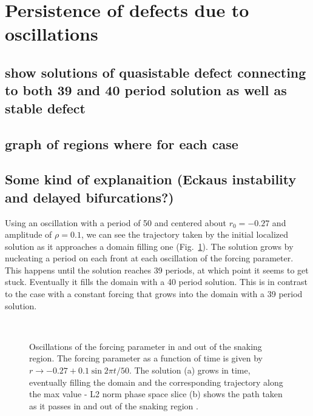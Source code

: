 \documentclass[../main/TimeForcingSHE.tex]{subfiles}
\begin{document}
\section{Persistence of defects due to oscillations}
\subsection{show solutions of quasistable defect connecting to both 39 and 40 period solution as well as stable defect}
\subsection{graph of regions where for each case}
\subsection{Some kind of explanaition (Eckaus instability and delayed bifurcations?)}

Using an oscillation with a period of 50 and centered about $r_0=-0.27$ and amplitude of $\rho =0.1$, we can see the trajectory taken by the initial localized solution as it approaches a domain filling one (Fig.~\ref{fig:FillDomain}).  The solution grows by nucleating a period on each front at each oscillation of the forcing parameter. This happens until the solution reaches 39 periods, at which point it seems to get stuck.  Eventually it fills the domain with a 40 period solution.  This is in contrast to the case with a constant forcing that grows into the domain with a 39 period solution.  

\begin{figure}[h]
  \begin{center}
    \mbox{
       \quad
      }
    \caption{Oscillations of the forcing parameter in and out of the snaking region.  The forcing parameter as a function of time is given by $r\rightarrow -0.27+ 0.1\sin2\pi t/50$.  The solution (a) grows in time, eventually filling the domain and the corresponding trajectory along the max value - L2 norm phase space slice (b) shows the path taken as it passes in and out of the snaking region . }
    \label{fig:FillDomain}
  \end{center}
\end{figure} 
\end{document}

